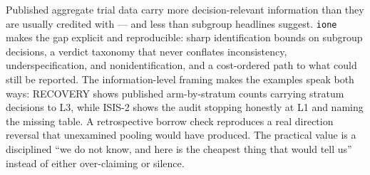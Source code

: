 \documentclass[article]{ajs}
\begin{document}
Published aggregate trial data carry more decision-relevant information
than they are usually credited with --- and less than subgroup headlines
suggest. \texttt{ione} makes the gap explicit and reproducible: sharp
identification bounds on subgroup decisions, a verdict taxonomy that
never conflates inconsistency, underspecification, and
nonidentification, and a cost-ordered path to what could still be
reported. The information-level framing makes the examples speak both
ways: RECOVERY shows published arm-by-stratum counts carrying stratum
decisions to L3, while ISIS-2 shows the audit stopping honestly at L1
and naming the missing table. A retrospective borrow check reproduces
a real direction reversal that unexamined pooling would have produced.
The practical value is a disciplined ``we do not know, and here is the
cheapest thing that would tell us'' instead of either over-claiming or
silence.


\end{document}
